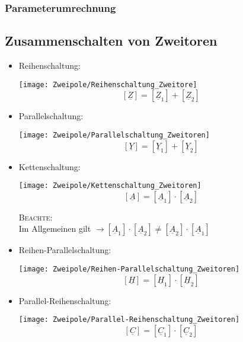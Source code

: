 \subsubsection{Parameterumrechnung}


\subsection{Zusammenschalten von Zweitoren}

\begin{mdframed}[style=exercise]
\begin{itemize}
    \item Reihenschaltung:
        \begin{center}
            \texttt{[image: Zweipole/Reihenschaltung\_Zweitore]}
        \[
            \left[ \underline{Z} \right] = \left[ \underline{Z}_1 \right] + \left[ \underline{Z}_2 \right]
        \]
        \end{center}
    \item Parallelschaltung:
        \begin{center}
            \texttt{[image: Zweipole/Parallelschaltung\_Zweitoren]}
        \[
            \left[ \underline{Y} \right] = \left[ \underline{Y}_1 \right] + \left[ \underline{Y}_2 \right]
        \]
        \end{center}
    \item Kettenschaltung:
        \begin{center}
            \texttt{[image: Zweipole/Kettenschaltung\_Zweitoren]}
        \[
            \left[ \underline{A} \right] = \left[ \underline{A}_1 \right] \cdot \left[ \underline{A}_2 \right]
        \]
        \end{center}
        \footnotesize
        \textsc{Beachte:}\\
        \normalsize Im Allgemeinen gilt $\rightarrow
        \left[ \underline{A}_1 \right] \cdot \left[
        \underline{A}_2 \right] \neq \left[ \underline{A}_2
        \right] \cdot \left[ \underline{A}_1 \right]$
    \item Reihen-Parallelschaltung:
        \begin{center}
            \texttt{[image: Zweipole/Reihen-Parallelschaltung\_Zweitoren]}
        \[
            \left[ \underline{H} \right] = \left[ \underline{H}_1 \right] \cdot \left[ \underline{H}_2 \right]
        \]
        \end{center}
    \item Parallel-Reihenschaltung:
        \begin{center}
            \texttt{[image: Zweipole/Parallel-Reihenschaltung\_Zweitoren]}
        \[
            \left[ \underline{C} \right] = \left[ \underline{C}_1 \right] \cdot \left[ \underline{C}_2 \right]
        \]
        \end{center}
\end{itemize}
\end{mdframed}


